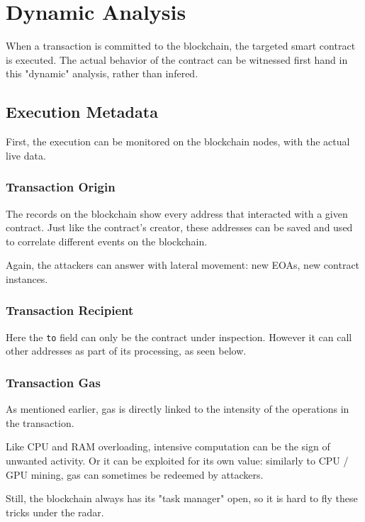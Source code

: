 \section{Dynamic Analysis} \label{sec:data-dynamic}

When a transaction is committed to the blockchain, the targeted smart contract is executed.
The actual behavior of the contract can be witnessed first hand in this "dynamic" analysis, rather than infered.

\subsection{Execution Metadata}

First, the execution can be monitored on the blockchain nodes, with the actual live data.

\subsubsection{Transaction Origin}

The records on the blockchain show every address that interacted with a given contract.
Just like the contract's creator, these addresses can be saved and used to correlate different events on the blockchain.

Again, the attackers can answer with lateral movement: new EOAs, new contract instances.

\subsubsection{Transaction Recipient}

Here the \lstinline[language=Solidity]{to} field can only be the contract under inspection.
However it can call other addresses as part of its processing, as seen below.

\subsubsection{Transaction Gas}

As mentioned earlier, gas is directly linked to the intensity of the operations in the transaction.

Like CPU and RAM overloading, intensive computation can be the sign of unwanted activity.
Or it can be exploited for its own value: similarly to CPU / GPU mining, gas can sometimes be redeemed by attackers.

Still, the blockchain always has its "task manager" open, so it is hard to fly these tricks under the radar.

